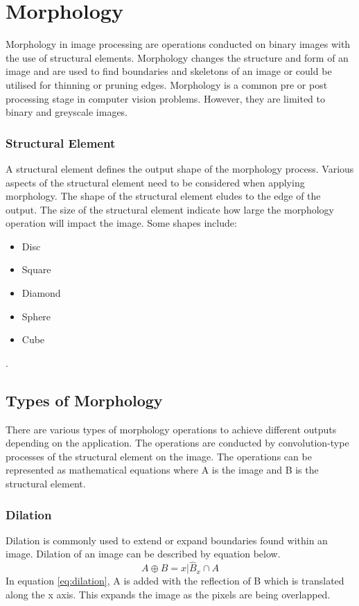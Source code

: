 \section{Morphology}
Morphology in image processing are operations conducted on binary images with the use of structural elements. Morphology changes the structure and form of an image and are used to find boundaries and skeletons of an image or could be utilised for thinning or pruning edges. Morphology is a common pre or post processing stage in computer vision problems. However, they are limited to binary and greyscale images. 
\subsubsection{Structural Element}
A structural element defines the output shape of the morphology process. Various aspects of the structural element need to be considered when applying morphology. The shape of the structural element eludes to the edge of the output. The size of the structural element indicate how large the morphology operation will impact the image. Some shapes include:
\begin{itemize}
	\item Disc
	\item Square
	\item Diamond
	\item Sphere
	\item Cube
\end{itemize}
 \cite{ref:morph_3}.
\subsection{Types of Morphology}
There are various types of morphology operations to achieve different outputs depending on the application. The operations are conducted by convolution-type processes of the structural element on the image. The operations can be represented as mathematical equations where A is the image and B is the structural element.

\subsubsection{Dilation}
Dilation is commonly used to extend or expand boundaries found within an image. Dilation of an image can be described by equation below. 
\begin{equation}
A \oplus B = {x | \hat{B}_x \cap A }
\label{eq:dilation}
\end{equation} 
In equation \ref{eq:dilation}, A is added with the reflection of B which is translated along the x axis. This expands the image as the pixels are being overlapped.


